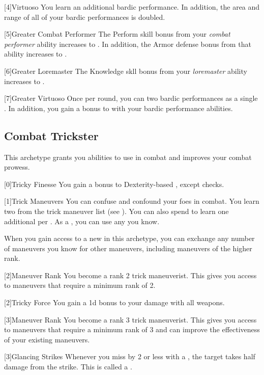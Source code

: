         [4]{Virtuoso} You learn an additional bardic performance.
        In addition, the area and range of all of your bardic performances is doubled.

        [5]{Greater Combat Performer} The Perform skill bonus from your \textit{combat performer} ability increases to .
        In addition, the Armor defense bonus from that ability increases to .

        [6]{Greater Loremaster} The Knowledge skll bonus from your \textit{loremaster} ability increases to .

        [7]{Greater Virtuoso} Once per round, you can  two bardic performances as a single .
        In addition, you gain a  bonus to  with your bardic performance abilities.

    \newpage
    \subsection{Combat Trickster}
        This archetype grants you abilities to use in combat and improves your combat prowess.

        [0]{Tricky Finesse} You gain a  bonus to Dexterity-based , except  checks.

        {
            [1]{Trick Maneuvers}
            You can confuse and confound your foes in combat.
            You learn two  from the trick maneuver list (see ).
            You can also spend  to learn one additional  per .
            As a , you can use any  you know.

            When you gain access to a new  in this archetype,
                you can exchange any number of maneuvers you know for other maneuvers,
                including maneuvers of the higher rank.
        }

        {
            [2]{Maneuver Rank} You become a rank 2 trick maneuverist.
            This gives you access to maneuvers that require a minimum rank of 2.

            [2]{Tricky Force} You gain a \plus1d bonus to your damage with all weapons.
        }

        {
            [3]{Maneuver Rank} You become a rank 3 trick maneuverist.
            This gives you access to maneuvers that require a minimum rank of 3 and can improve the effectiveness of your existing maneuvers.

            [3]{Glancing Strikes} Whenever you miss by 2 or less with a , the target takes half damage from the strike.
            This is called a .
        }

